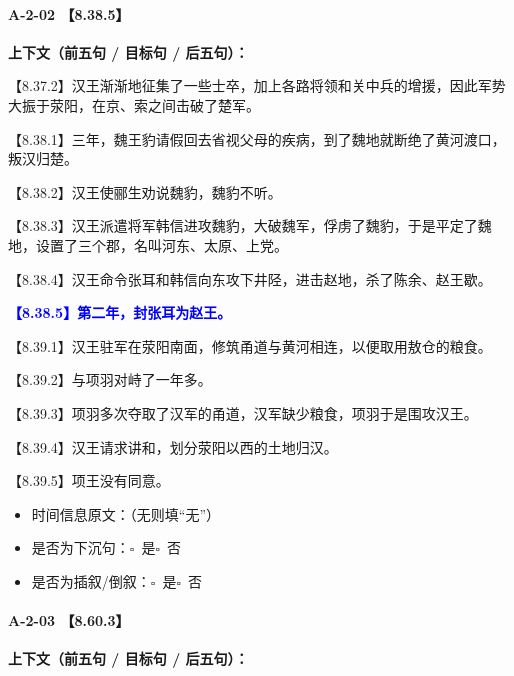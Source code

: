 \documentclass[fontset=none,11pt,a4paper]{ctexart}
\newcommand{\answerline}[1]{\underline{\hspace{#1}}}
\newcommand{\choicebox}[1]{$\square$~#1}
\begin{document}
\paragraph{A-2-02 \quad 【8.38.5】}
\textbf{上下文（前五句 / 目标句 / 后五句）：}

\noindent 【8.37.2】汉王渐渐地征集了一些士卒，加上各路将领和关中兵的增援，因此军势大振于荥阳，在京、索之间击破了楚军。\par
\noindent 【8.38.1】三年，魏王豹请假回去省视父母的疾病，到了魏地就断绝了黄河渡口，叛汉归楚。\par
\noindent 【8.38.2】汉王使郦生劝说魏豹，魏豹不听。\par
\noindent 【8.38.3】汉王派遣将军韩信进攻魏豹，大破魏军，俘虏了魏豹，于是平定了魏地，设置了三个郡，名叫河东、太原、上党。\par
\noindent 【8.38.4】汉王命令张耳和韩信向东攻下井陉，进击赵地，杀了陈余、赵王歇。\par
\noindent \textcolor{blue}{\textbf{【8.38.5】第二年，封张耳为赵王。}}\par
\noindent 【8.39.1】汉王驻军在荥阳南面，修筑甬道与黄河相连，以便取用敖仓的粮食。\par
\noindent 【8.39.2】与项羽对峙了一年多。\par
\noindent 【8.39.3】项羽多次夺取了汉军的甬道，汉军缺少粮食，项羽于是围攻汉王。\par
\noindent 【8.39.4】汉王请求讲和，划分荥阳以西的土地归汉。\par
\noindent 【8.39.5】项王没有同意。\par

\begin{itemize}
  \item 时间信息原文：\answerline{7.5cm}（无则填“无”）
  \item 是否为下沉句：\choicebox{是}\quad \choicebox{否}
  \item 是否为插叙/倒叙：\choicebox{是}\quad \choicebox{否}
\end{itemize}

\paragraph{A-2-03 \quad 【8.60.3】}
\textbf{上下文（前五句 / 目标句 / 后五句）：}
\end{document}
